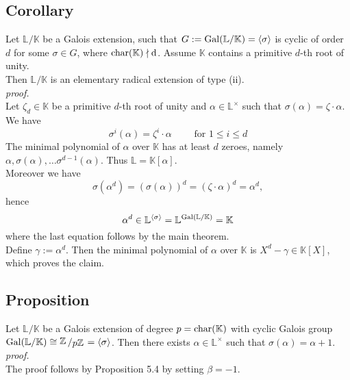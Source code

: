 \documentclass[12pt]{book}
\newcommand{\slant}[2]{{\raisebox{.1em}{$#1$}\left/\raisebox{-.1em}{$#2$}\right.}}
\begin{document}
\begin{spacing}{1.3}
\subsection{Corollary} %
Let $\mathbb{L}/\mathbb{K}$ be a Galois extension, such that $G:=\rm{Gal}(\mathbb{L}/\mathbb{K})=\langle \sigma \rangle$ is cyclic of order $d$ for some $\sigma \in G$, where $\rm{char}(\mathbb{K}) \nmid d$. Assume $\mathbb{K}$ contains a primitive $d$-th root of unity.\\ Then $\mathbb{L}/\mathbb{K}$ is an elementary radical extension of type (ii).\\
\textit{proof.}\\
Let $\zeta_d\in \mathbb{K}$ be a primitive $d$-th root of unity and $\alpha \in \mathbb{L}^{\times}$ such that $\sigma(\alpha)=\zeta \cdot \alpha$.\\
We have $$\sigma^{i}(\alpha)=\zeta^{i} \cdot \alpha \qquad \textrm{ for }1 \leqslant i \leqslant d$$ The minimal polynomial of $\alpha$ over $\mathbb{K}$ has at least $d$ zeroes, namely $\alpha, \sigma(\alpha), \dots \sigma^{d-1}(\alpha)$. Thus $\mathbb{L}=\mathbb{K}[\alpha]$.\\
Moreover we have $$\sigma(\alpha^d)=\left(\sigma(\alpha)\right)^d=\left(\zeta \cdot \alpha \right)^d=\alpha^d,$$hence $$\alpha^d \in \mathbb{L}^{\langle \sigma \rangle}=\mathbb{L}^{\rm{Gal}(\mathbb{L}/\mathbb{K})}=\mathbb{K}$$
where the last equation follows by the main theorem.\\
Define $\gamma:=\alpha^d$. Then the minimal polynomial of  $\alpha$ over $\mathbb{K}$ is $X^d-\gamma \in \mathbb{K}[X]$, which proves the claim.

\subsection{Proposition} %
Let $\mathbb{L}/\mathbb{K}$ be a Galois extension of degree $p=\rm{char}(\mathbb{K})$ with cyclic Galois group $\rm{Gal}(\mathbb{L}/\mathbb{K}) \cong \slant{\mathbb{Z}}{p \mathbb{Z}} = \langle \sigma \rangle$.
Then there exists $\alpha \in \mathbb{L}^{\times}$ such that $\sigma(\alpha)=\alpha+1$.\\
\textit{proof.}\\
The proof follows by Proposition 5.4 by setting $\beta=-1$. 


\end{spacing}
\end{document}
